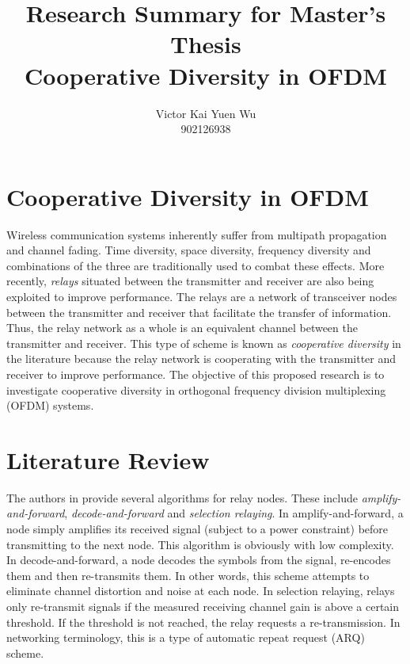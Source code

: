 \documentclass[12]{article}
\begin{document}
\title{Research Summary for Master's Thesis\\ Cooperative Diversity in OFDM}
\author{Victor Kai Yuen Wu \\ 902126938}
\maketitle

\newpage
\section{Cooperative Diversity in OFDM}
Wireless communication systems inherently suffer from multipath propagation and channel fading.  Time diversity, space diversity, frequency diversity \cite{mybib:book_0001} and combinations of the three are traditionally used to combat these effects.  More recently, \emph{relays} situated between the transmitter and receiver are also being exploited to improve performance.  The relays are a network of transceiver nodes between the transmitter and receiver that facilitate the transfer of information.  Thus, the relay network as a whole is an equivalent channel between the transmitter and receiver.  This type of scheme is known as \emph{cooperative diversity} in the literature because the relay network is cooperating with the transmitter and receiver to improve performance.  The objective of this proposed research is to investigate cooperative diversity in orthogonal frequency division multiplexing (OFDM) systems.

\section{Literature Review}
The authors in \cite{mybib:journal_0001} provide several algorithms for relay nodes.  These include \emph{amplify-and-forward}, \emph{decode-and-forward} and \emph{selection relaying}.  In amplify-and-forward, a node simply amplifies its received signal (subject to a power constraint) before transmitting to the next node.  This algorithm is obviously with low complexity.  In decode-and-forward, a node decodes the symbols from the signal, re-encodes them and then re-transmits them.  In other words, this scheme attempts to eliminate channel distortion and noise at each node.  In selection relaying, relays only re-transmit signals if the measured receiving channel gain is above a certain threshold.  If the threshold is not reached, the relay requests a re-transmission.  In networking terminology, this is a type of automatic repeat request (ARQ) scheme.
\end{document}
